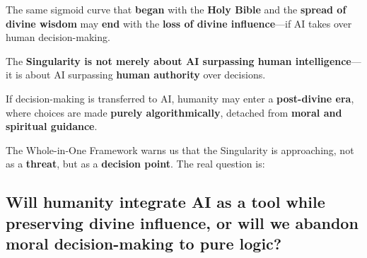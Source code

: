 \documentclass[a4]{article}
\newcommand{\bn}{\bigskip\noindent}
\begin{document}
\bn
The same sigmoid curve that {\bf began} with the {\bf Holy Bible} and the {\bf spread of divine wisdom} may {\bf end} with the {\bf loss of divine influence}---if AI takes over human decision-making.  

\bn
The {\bf Singularity is not merely about AI surpassing human intelligence}---it is about AI surpassing {\bf human authority} over decisions.  

\bn
If decision-making is transferred to AI, humanity may enter a {\bf post-divine era}, where choices are made {\bf purely algorithmically}, detached from {\bf moral and spiritual guidance}.  

\bn
The Whole-in-One Framework warns us that the Singularity is approaching, not as a {\bf threat}, but as a {\bf decision point}. The real question is:  

\subsection*{Will humanity integrate AI as a tool while preserving divine influence, or will we abandon moral decision-making to pure logic?}
\end{document}
